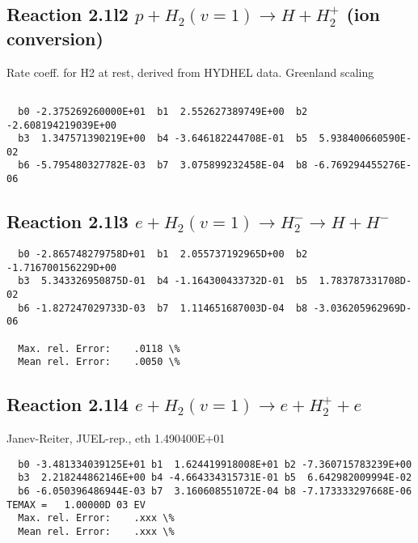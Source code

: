 \documentclass[12pt,dvipdfmx]{article}
\begin{document}
\subsection{
Reaction 2.1l2
$ p + H_2(v=1) \rightarrow H + H_2^+$ (ion conversion)
}
Rate coeff. for H2 at rest, derived from HYDHEL data. Greenland scaling


\begin{small}\begin{verbatim}

  b0 -2.375269260000E+01  b1  2.552627389749E+00  b2 -2.608194219039E+00
  b3  1.347571390219E+00  b4 -3.646182244708E-01  b5  5.938400660590E-02
  b6 -5.795480327782E-03  b7  3.075899232458E-04  b8 -6.769294455276E-06

\end{verbatim}\end{small}

\subsection{
Reaction 2.1l3
 $ e + H_2(v=1) \rightarrow H_2^- \rightarrow H + H^-$
}


\begin{small}\begin{verbatim}
  b0 -2.865748279758D+01  b1  2.055737192965D+00  b2 -1.716700156229D+00
  b3  5.343326950875D-01  b4 -1.164300433732D-01  b5  1.783787331708D-02
  b6 -1.827247029733D-03  b7  1.114651687003D-04  b8 -3.036205962969D-06

  Max. rel. Error:    .0118 \%
  Mean rel. Error:    .0050 \%
\end{verbatim}\end{small}



\subsection{
Reaction 2.1l4
 $ e + H_2(v=1) \rightarrow e + H_2^+ + e$
}
Janev-Reiter, JUEL-rep., eth 1.490400E+01

\begin{small}\begin{verbatim}
  b0 -3.481334039125E+01 b1  1.624419918008E+01 b2 -7.360715783239E+00
  b3  2.218244862146E+00 b4 -4.664334315731E-01 b5  6.642982009994E-02
  b6 -6.050396486944E-03 b7  3.160608551072E-04 b8 -7.173333297668E-06
TEMAX =   1.00000D 03 EV
  Max. rel. Error:    .xxx \%
  Mean rel. Error:    .xxx \%
\end{verbatim}\end{small}
\end{document}
